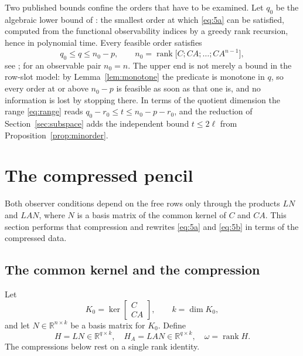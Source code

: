 \documentclass[journal]{IEEEtran}
\theoremstyle{plainn}
\theoremstyle{remark}
\begin{document}
Two published bounds confine the orders that have to be examined. Let $q_0$ be the algebraic
lower bound of \cite{fer26a,fer26b}: the smallest order at which \eqref{eq:5a} can be satisfied,
computed from the functional observability indices by a greedy rank recursion, hence in polynomial
time. Every feasible order satisfies
\begin{equation}\label{eq:range}
q_0\le q\le n_0-p,\qquad n_0=\operatorname{rank}\bigl[C;CA;\dots;CA^{n-1}\bigr],
\end{equation}
see \cite{fer26a,fer26b}; for an observable pair $n_0=n$. The upper end is not merely a bound in the
row-slot model: by Lemma~\ref{lem:monotone} the predicate is monotone in $q$, so every order at or
above $n_0-p$ is feasible as soon as that one is, and no information is lost by stopping there. In
terms of the quotient dimension the range \eqref{eq:range} reads
$q_0-r_0\le t\le n_0-p-r_0$, and the reduction of Section~\ref{sec:subspace} adds the independent
bound $t\le2\ell$ from Proposition~\ref{prop:minorder}.

\section{The compressed pencil}\label{sec:compressed}

Both observer conditions depend on the free rows only through the products $LN$ and $LAN$, where $N$ is a basis matrix of the common kernel of $C$ and $CA$. This section performs that compression and rewrites \eqref{eq:5a} and \eqref{eq:5b} in terms of the compressed data.

\subsection{The common kernel and the compression}\label{sec:compress}

Let
\begin{equation*}
K_0=\ker\begin{bmatrix}C\\ CA\end{bmatrix},\qquad k=\dim K_0,
\end{equation*}
and let $N\in\mathbb R^{n\times k}$ be a basis matrix for $K_0$. Define
\begin{equation*}
H=LN\in\mathbb R^{q\times k},\quad H_A=LAN\in\mathbb R^{q\times k},\quad \omega=\operatorname{rank}H .
\end{equation*}
The compressions below rest on a single rank identity.
\end{document}
